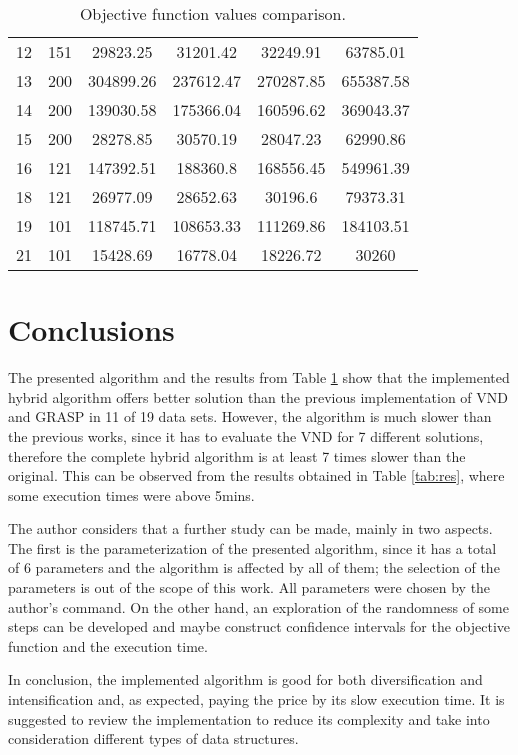 \documentclass[10pt,twoside]{article}
\begin{document}
\begin{table}
\begin{tabular}{cccccc}
12                & 151            & 29823.25        & 31201.42          & 32249.91        & 63785.01          \\
13                & 200            & 304899.26       & 237612.47         & 270287.85       & 655387.58         \\
14                & 200            & 139030.58       & 175366.04         & 160596.62       & 369043.37         \\
15                & 200            & 28278.85        & 30570.19          & 28047.23        & 62990.86          \\
16                & 121            & 147392.51       & 188360.8          & 168556.45       & 549961.39         \\
18                & 121            & 26977.09        & 28652.63          & 30196.6         & 79373.31          \\
19                & 101            & 118745.71       & 108653.33         & 111269.86       & 184103.51         \\
21                & 101            & 15428.69        & 16778.04          & 18226.72        & 30260             \\ \hline
\end{tabular}
\caption{Objective function values comparison.}
\label{tab:compar}
\end{table}



\section{Conclusions}
The presented algorithm and the results from Table \ref{tab:compar} show that the implemented hybrid algorithm offers better solution than the previous implementation of VND and GRASP in 11 of 19 data sets. However, the algorithm is much slower than the previous works, since it has to evaluate the VND for 7 different solutions, therefore the complete hybrid algorithm is at least 7 times slower than the original. This can be observed from the results obtained in Table \ref{tab:res}, where some execution times were above 5mins. 

The author considers that a further study can be made, mainly in two aspects. The first is the parameterization of the presented algorithm, since it has a total of 6 parameters and the algorithm is affected by all of them; the selection of the parameters is out of the scope of this work. All parameters were chosen by the author's command. On the other hand, an exploration of the randomness of some steps can be developed and maybe construct confidence intervals for the objective function and the execution time. 

In conclusion, the implemented algorithm is good for both diversification and intensification and, as expected, paying the price by its slow execution time. It is suggested to review the implementation to reduce its complexity and take into consideration different types of data structures.



{\small


}
\end{document}
